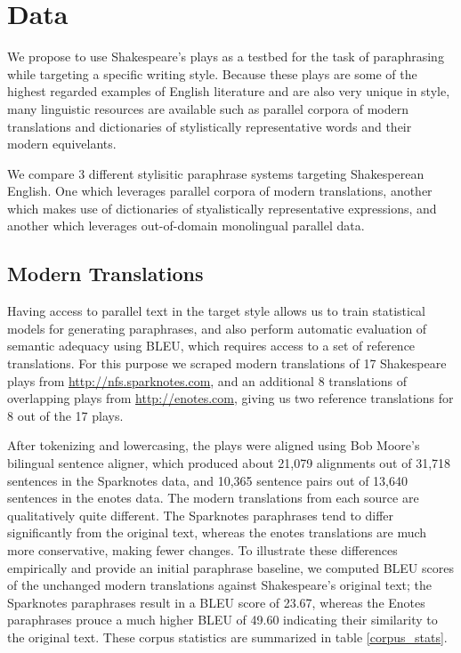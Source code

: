 \documentclass[10pt,a5paper,twoside]{article}
\begin{document}
\section{Data}
We propose to use Shakespeare's plays as a testbed for the task of paraphrasing while targeting a specific writing style.  Because these plays are some of the
highest regarded examples of English literature and are also very unique in style, many linguistic resources are available such as parallel corpora
of modern translations and dictionaries of stylistically representative words and their modern equivelants.

We compare 3 different stylisitic paraphrase systems targeting Shakesperean English.  One which leverages parallel corpora of modern translations, another which makes use
of dictionaries of styalistically representative expressions, and another which leverages out-of-domain monolingual parallel data.

\subsection{Modern Translations}
Having access to parallel text in the target style allows us to train statistical models for generating paraphrases, and also perform automatic evaluation of semantic adequacy using BLEU, which requires access to a set of reference translations.  For this purpose we scraped modern translations of 17 Shakespeare plays from \url{http://nfs.sparknotes.com}, and an additional 8 translations of overlapping plays from \url{http://enotes.com}, giving us two reference translations for 8 out of the 17 plays.

After tokenizing and lowercasing, the plays were aligned using Bob Moore's bilingual sentence \cite{Moore02} aligner, which produced about 21,079 alignments out of 31,718 sentences in the Sparknotes data, and 10,365 sentence pairs out of 13,640 sentences in the enotes data.  The modern translations from each source are qualitatively quite
different.  The Sparknotes paraphrases tend to differ significantly from the original text, whereas the enotes translations are much more conservative, making fewer changes.
To illustrate these differences empirically and provide an initial paraphrase baseline, we computed BLEU scores of the unchanged modern translations against Shakespeare's 
original text; the Sparknotes paraphrases result in a BLEU score of 23.67, whereas the Enotes paraphrases prouce a much higher BLEU of 49.60 indicating their similarity to the original text.
These corpus statistics are summarized in table \ref{corpus_stats}.
\end{document}
